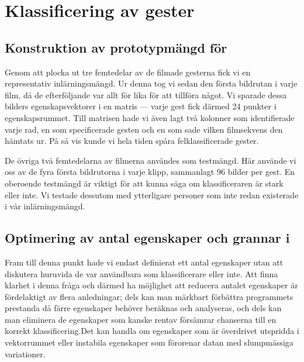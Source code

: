 \documentclass[../rapport_MVEX01-11-05]{subfiles}
\begin{document}
\section{Klassificering av gester} 

\subsection{Konstruktion av prototypmängd för \knn}
Genom att plocka ut tre femtedelar av de filmade gesterna fick vi en
representativ inlärningsmängd. Ur denna tog vi sedan den första bildrutan i
varje film, då de efterföljande var allt för lika för att tillföra något. Vi
sparade dessa bilders egenskapsvektorer i en matris --- varje gest 
fick därmed 24 punkter i
egenskapsrummet. Till matrisen hade vi även lagt två kolonner som identifierade
varje rad, en som specificerade gesten och en som sade vilken filmsekvens den
hämtats ur. På så vis kunde vi hela tiden spåra felklassificerade gester.

De övriga två femtedelarna av filmerna användes som testmängd. Här använde vi oss
av de fyra första bildrutorna i varje klipp, sammanlagt 96 bilder per gest.
En oberoende testmängd är viktigt för att kunna säga om klassificeraren är
stark eller inte. Vi testade dessutom med ytterligare personer som
inte redan existerade i vår inlärningsmängd.

%

\subsection{Optimering av antal egenskaper och grannar i \knn}
Fram till denna punkt hade vi endast definierat ett antal egenskaper utan att
diskutera huruvida de var användbara som klassificerare eller inte. Att finna
klarhet i denna fråga och därmed ha möjlighet att reducera antalet egenskaper är
fördelaktigt av flera anledningar; dels kan man märkbart förbättra programmets
prestanda då färre egenskaper behöver beräknas och analyseras, och dels kan man
eliminera de egenskaper som kanske rentav försämrar chanserna till en korrekt
klassificering.Det kan handla om egenskaper som är överdrivet utspridda i
vektorrummet eller instabila egenskaper som förorenar datan med slumpmässiga
variationer.
\end{document}
